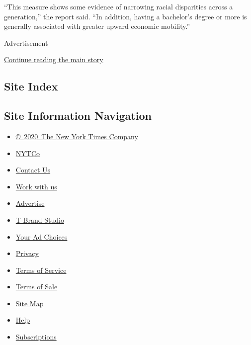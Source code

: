 ``This measure shows some evidence of narrowing racial disparities
across a generation,'' the report said. ``In addition, having a
bachelor's degree or more is generally associated with greater upward
economic mobility.''

Advertisement

\protect\hyperlink{after-bottom}{Continue reading the main story}

\hypertarget{site-index}{%
\subsection{Site Index}\label{site-index}}

\hypertarget{site-information-navigation}{%
\subsection{Site Information
Navigation}\label{site-information-navigation}}

\begin{itemize}
\tightlist
\item
  \href{https://help.nytimes3xbfgragh.onion/hc/en-us/articles/115014792127-Copyright-notice}{©~2020~The
  New York Times Company}
\end{itemize}

\begin{itemize}
\tightlist
\item
  \href{https://www.nytco.com/}{NYTCo}
\item
  \href{https://help.nytimes3xbfgragh.onion/hc/en-us/articles/115015385887-Contact-Us}{Contact
  Us}
\item
  \href{https://www.nytco.com/careers/}{Work with us}
\item
  \href{https://nytmediakit.com/}{Advertise}
\item
  \href{http://www.tbrandstudio.com/}{T Brand Studio}
\item
  \href{https://www.nytimes3xbfgragh.onion/privacy/cookie-policy\#how-do-i-manage-trackers}{Your
  Ad Choices}
\item
  \href{https://www.nytimes3xbfgragh.onion/privacy}{Privacy}
\item
  \href{https://help.nytimes3xbfgragh.onion/hc/en-us/articles/115014893428-Terms-of-service}{Terms
  of Service}
\item
  \href{https://help.nytimes3xbfgragh.onion/hc/en-us/articles/115014893968-Terms-of-sale}{Terms
  of Sale}
\item
  \href{https://spiderbites.nytimes3xbfgragh.onion}{Site Map}
\item
  \href{https://help.nytimes3xbfgragh.onion/hc/en-us}{Help}
\item
  \href{https://www.nytimes3xbfgragh.onion/subscription?campaignId=37WXW}{Subscriptions}
\end{itemize}
